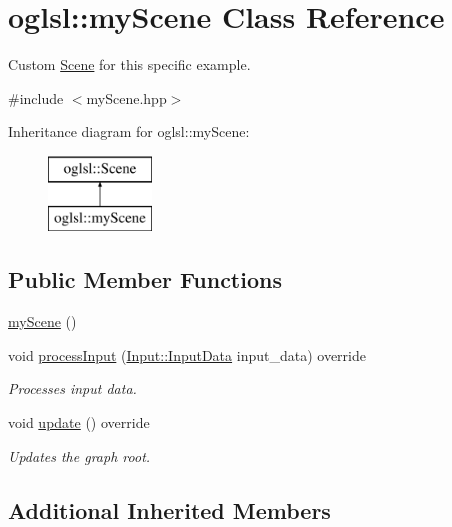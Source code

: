 \hypertarget{classoglsl_1_1my_scene}{}\section{oglsl\+:\+:my\+Scene Class Reference}
\label{classoglsl_1_1my_scene}


Custom \mbox{\hyperlink{classoglsl_1_1_scene}{Scene}} for this specific example.  




{\ttfamily \#include $<$my\+Scene.\+hpp$>$}

Inheritance diagram for oglsl\+:\+:my\+Scene\+:\begin{figure}[H]
\begin{center}
\leavevmode
\includegraphics[height=2.000000cm]{classoglsl_1_1my_scene}
\end{center}
\end{figure}
\subsection*{Public Member Functions}
\begin{DoxyCompactItemize}
\item 
\mbox{\hyperlink{classoglsl_1_1my_scene_a1ea16fb5ced9ac6f5fea4db7688d6076}{my\+Scene}} ()
\item 
void \mbox{\hyperlink{classoglsl_1_1my_scene_aeab1e8cfe8c40f6110e1789a74008191}{process\+Input}} (\mbox{\hyperlink{classoglsl_1_1_input_a3b21d7328538e661f366af5d6059c197}{Input\+::\+Input\+Data}} input\+\_\+data) override
\begin{DoxyCompactList}\small\item\em Processes input data. \end{DoxyCompactList}\item 
void \mbox{\hyperlink{classoglsl_1_1my_scene_a798dcfe11aee5c093013c59b665b6754}{update}} () override
\begin{DoxyCompactList}\small\item\em Updates the graph root. \end{DoxyCompactList}\end{DoxyCompactItemize}
\subsection*{Additional Inherited Members}



